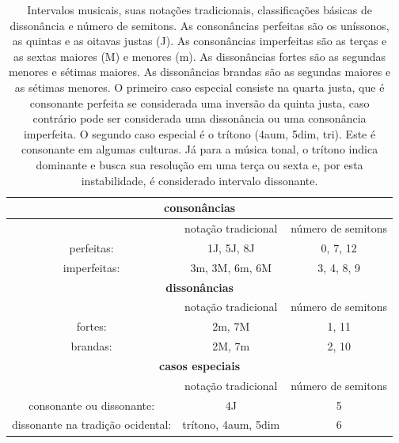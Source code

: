 \begin{table}[htpq!]
\centering
\caption{Intervalos musicais, suas notações tradicionais, classificações básicas de dissonância e número de semitons.
As consonâncias perfeitas são os uníssonos, as quintas e as oitavas justas (J). As consonâncias imperfeitas são
as terças e as sextas maiores (M) e menores (m). As dissonâncias fortes são as segundas menores e sétimas maiores. As dissonâncias
brandas são as segundas maiores e as sétimas menores. O primeiro caso especial consiste na quarta justa, que é consonante perfeita
se considerada uma inversão da quinta justa, caso contrário pode ser considerada uma dissonância ou uma consonância imperfeita. O segundo caso especial é o trítono (4aum, 5dim, tri). Este é consonante em algumas culturas. Já para a música tonal, o trítono indica dominante e busca sua resolução em uma terça ou sexta e, por esta instabilidade, é considerado intervalo dissonante.}
\begin{tabular}{| c | c | c | }\hline
    \multicolumn{3}{|c|}{\bf consonâncias}  \\\hline
   & notação tradicional & número de semitons \\
   perfeitas: & 1J, 5J, 8J & 0, 7, 12 \\
 imperfeitas: & 3m, 3M, 6m, 6M & 3, 4, 8, 9 \\\hline\hline
    \multicolumn{3}{|c|}{\bf dissonâncias} \\\hline
 & notação tradicional & número de semitons \\
 fortes: & 2m, 7M & 1, 11 \\
 brandas: & 2M, 7m & 2, 10 \\\hline\hline
    \multicolumn{3}{|c|}{\bf casos especiais} \\\hline
 & notação tradicional & número de semitons \\
 consonante ou dissonante: & 4J & 5 \\
 dissonante na tradição ocidental: & trítono, 4aum, 5dim & 6 \\\hline
\end{tabular}\label{eq:intervalos}
\end{table}


